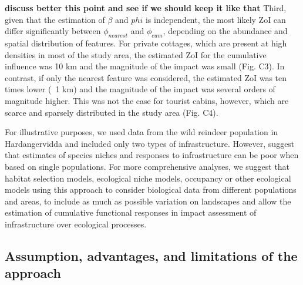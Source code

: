\documentclass[titlepage]{article}
\begin{document}
\textbf{discuss better this point and see if we should keep it like that}
Third, given that the estimation of $\beta$ and $phi$ is independent, the most likely ZoI can differ significantly between $\phi_{nearest}$ and $\phi_{cum}$, depending on the abundance and spatial distribution of features. For private cottages, which are present at high densities in most of the study area, the estimated ZoI for the cumulative influence was 10 km and the magnitude of the impact was small (Fig. C3). In contrast, if only the nearest feature was considered, the estimated ZoI was ten times lower (~1 km) and the magnitude of the impact was several orders of magnitude higher. This was not the case for tourist cabins, however, which are scarce and sparsely distributed in the study area (Fig. C4).    

For illustrative purposes, we used data from the wild reindeer population in Hardangervidda and included only two types of infrastructure. However, 
\citet{panzacchi_searching_2015} suggest that estimates of species niches and responses to infrastructure can be poor when based on single populations. For more comprehensive analyses, we suggest that habitat selection models, ecological niche models, occupancy or other ecological models using this approach to consider biological data from different populations and areas, to include as much as possible variation on landscapes and allow the estimation of cumulative functional responses in impact assessment of infrastructure over ecological processes.  

\subsection{Assumption, advantages, and limitations of the approach}
\end{document}

